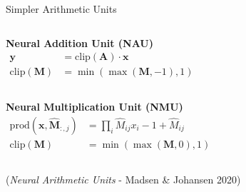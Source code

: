 \documentclass[aspectratio=169,professionalfont,xcolor={dvipsnames},hyperref={colorlinks=true,urlcolor=MidnightBlue}]{beamer}
\begin{document}
\begin{frame}{Simpler Arithmetic Units}
  \begin{columns}
    \centering
    

    \centering
    \textbf{Neural Addition Unit (NAU)} 
    \begin{align*}
      \bm y &= \mathrm{clip}(\bm A) \cdot \bm x\\
      \mathrm{clip}(\bm M) &= \min(\max(\bm M,-1),1)
    \end{align*}
  \end{columns}
  \vfill
  \begin{columns}
    \centering
    

    \centering
    \textbf{Neural Multiplication Unit (NMU)} 
    \begin{align*}
      \mathrm{prod}(\bm x, \hat{\bm M}_{:,j}) &= \prod_i \hat M_{ij} x_i -1 + \hat M_{ij}\\
      \mathrm{clip}(\bm M) &= \min(\max(\bm M,0),1)
    \end{align*}
  \end{columns}

  \vfill
  {\tiny(\emph{Neural Arithmetic Units}  - Madsen \& Johansen 2020)}
\end{frame}
\end{document}
